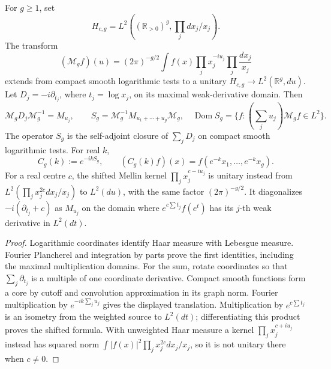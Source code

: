 \begin{lemma}
\label{v4-arith:w9-r6:lem:mellin-unitary-g}
For \(g\ge1\), set
\[H_{c,g}=L^2((\mathbb R_{>0})^g,\prod_j dx_j/x_j).\]
The transform
\begin{equation}
 (\mathcal M_g f)(u)=(2\pi)^{-g/2}\int f(x)
          \prod_j x_j^{-iu_j}\prod_j\frac{dx_j}{x_j}
 \label{v4-arith:w9-r6:eq:mellin-g}
\end{equation}
extends from compact smooth logarithmic tests to a unitary
\(H_{c,g}\to L^2(\mathbb R^g,du)\).
Let \(D_j=-i\partial_{t_j}\), where \(t_j=\log x_j\), on its
maximal weak-derivative domain. Then
\[
 \mathcal M_gD_j\mathcal M_g^{-1}=M_{u_j},\qquad
 S_g=\mathcal M_g^{-1}M_{u_1+\cdots+u_g}\mathcal M_g,
 \quad
 \operatorname{Dom}S_g=\{f:(\textstyle\sum_j u_j)\mathcal M_gf\in L^2\}.
\]
The operator \(S_g\) is the self-adjoint closure of \(\sum_jD_j\)
on compact smooth logarithmic tests. For real \(k\),
\[
 C_g(k):=e^{-ikS_g},\qquad
 (C_g(k)f)(x)=f(e^{-k}x_1,\ldots,e^{-k}x_g).
\]
For a real centre \(c\), the shifted Mellin kernel
\(\prod_jx_j^{c-iu_j}\) is unitary instead from
\(L^2(\prod_jx_j^{2c}dx_j/x_j)\) to \(L^2(du)\), with the same
factor \((2\pi)^{-g/2}\). It diagonalizes
\(-i(\partial_{t_j}+c)\) as \(M_{u_j}\) on the domain where
\(e^{c\sum t_j}f(e^t)\) has its \(j\)-th weak derivative in \(L^2(dt)\).
\end{lemma}
\begin{proof}
Logarithmic coordinates identify Haar measure with Lebesgue measure.
Fourier Plancherel and integration by parts prove the first identities,
including the maximal multiplication domains. For the sum, rotate
coordinates so that \(\sum_j\partial_{t_j}\) is a multiple of one
coordinate derivative. Compact smooth functions form a core by
cutoff and convolution approximation in its graph norm.
Fourier multiplication by \(e^{-ik\sum_j u_j}\) gives the displayed
translation. Multiplication by \(e^{c\sum t_j}\) is an isometry from
the weighted source to \(L^2(dt)\); differentiating this product
proves the shifted formula. With unweighted Haar measure a kernel
\(\prod_j x_j^{c+iu_j}\) instead has squared norm
\(\int |f(x)|^2\prod_jx_j^{2c}dx_j/x_j\), so it is not unitary
there when \(c\ne0\).
\end{proof}

